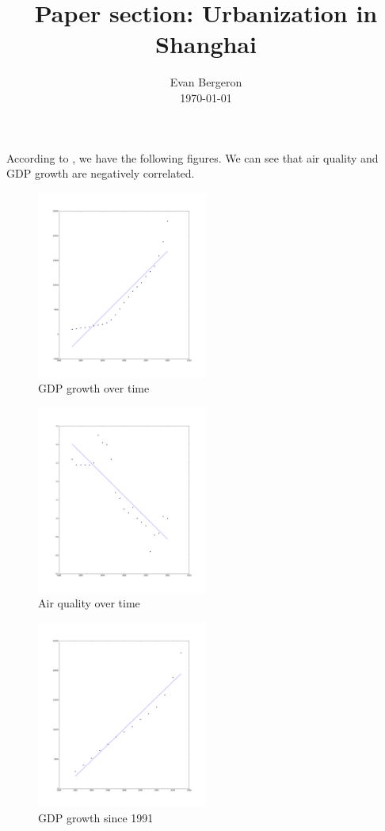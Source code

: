 \documentclass{amsart}
\title{Paper section: Urbanization in Shanghai}
\author{Evan Bergeron\\
\today
}
\begin{document}
\maketitle
According to \cite{Xia2014}, we have the following figures. We can see
that air quality and GDP growth are negatively correlated.

\begin{figure}[h]
\centering
\includegraphics[width=0.5\textwidth]{img/growth_gdp}
\caption{GDP growth over time}
\end{figure}

\begin{figure}[h]
\centering
\includegraphics[width=0.5\textwidth]{img/air_quality}
\caption{Air quality over time}
\end{figure}

\begin{figure}[h]
\centering
\includegraphics[width=0.5\textwidth]{img/growth_gdp_1991}
\caption{GDP growth since 1991}
\end{figure}
\end{document}
